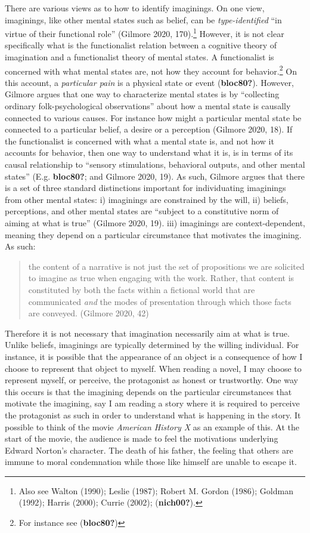 \documentclass[12pt]{book}
\theoremstyle{definition}
\theoremstyle{remark}
\begin{document}
There are various views as to how to identify imaginings. On one view, imaginings, like other mental states such as belief, can be \emph{type-identified} ``in virtue of their functional role'' (Gilmore 2020, 170).\footnote{Also see Walton (1990); Leslie (1987); Robert M. Gordon (1986); Goldman (1992); Harris (2000); Currie (2002); (\textbf{nich00?}).} However, it is not clear specifically what is the functionalist relation between a cognitive theory of imagination and a functionalist theory of mental states. A functionalist is concerned with what mental states are, not how they account for behavior.\footnote{For instance see (\textbf{bloc80?})} On this account, a \emph{particular pain} is a physical state or event (\textbf{bloc80?}). However, Gilmore argues that one way to characterize mental states is by ``collecting ordinary folk-psychological observations'' about how a mental state is causally connected to various causes. For instance how might a particular mental state be connected to a particular belief, a desire or a perception (Gilmore 2020, 18). If the functionalist is concerned with what a mental state is, and not how it accounts for behavior, then one way to understand what it is, is in terms of its causal relationship to ``sensory stimulations, behavioral outputs, and other mental states'' (E.g. \textbf{bloc80?}; and Gilmore 2020, 19). As such, Gilmore argues that there is a set of three standard distinctions important for individuating imaginings from other mental states: i) imaginings are constrained by the will, ii) beliefs, perceptions, and other mental states are ``subject to a constitutive norm of aiming at what is true'' (Gilmore 2020, 19). iii) imaginings are context-dependent, meaning they depend on a particular circumstance that motivates the imagining. As such:

\begin{quote}
the content of a narrative is not just the set of propositions we are solicited to imagine as true when engaging with the work. Rather, that content is constituted by both the facts within a fictional world that are communicated \emph{and} the modes of presentation through which those facts are conveyed. (Gilmore 2020, 42)
\end{quote}

Therefore it is not necessary that imagination necessarily aim at what is true. Unlike beliefs, imaginings are typically determined by the willing individual. For instance, it is possible that the appearance of an object is a consequence of how I choose to represent that object to myself. When reading a novel, I may choose to represent myself, or perceive, the protagonist as honest or trustworthy. One way this occurs is that the imagining depends on the particular circumstances that motivate the imagining, say I am reading a story where it is required to perceive the protagonist as such in order to understand what is happening in the story. It possible to think of the movie \emph{American History X} as an example of this. At the start of the movie, the audience is made to feel the motivations underlying Edward Norton's character. The death of his father, the feeling that others are immune to moral condemnation while those like himself are unable to escape it.
\end{document}
